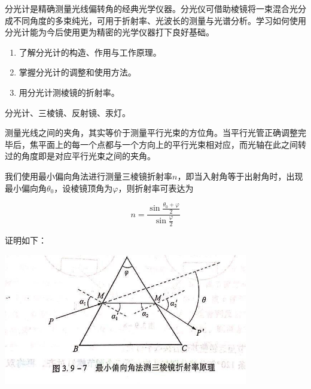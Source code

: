 \documentclass[UTF-8, a4paper, 12pt]{ctexart}
\begin{document}
    \begin{center}

    \end{center}
    \songti
    分光计是精确测量光线偏转角的经典光学仪器。分光仪可借助棱镜将一束混合光分成不同角度的多束纯光，可用于折射率、光波长的测量与光谱分析。学习如何使用分光计能为今后使用更为精密的光学仪器打下良好基础。

    \textbf{ }

    \songti

    \begin{enumerate}[（1）]
        \item 了解分光计的构造、作用与工作原理。
        \item 掌握分光计的调整和使用方法。
        \item 用分光计测棱镜的折射率。
    \end{enumerate}

    \textbf{ }

    \songti

    分光计、三棱镜、反射镜、汞灯。

    \textbf{ }

    \songti

    测量光线之间的夹角，其实等价于测量平行光束的方位角。当平行光管正确调整完毕后，焦平面上的每一个点都与一个方向上的平行光束相对应，而光轴在此之间转过的角度即是对应平行光束之间的夹角。

    我们使用最小偏向角法进行测量三棱镜折射率$n$，即当入射角等于出射角时，出现最小偏向角$\theta_0$，设棱镜顶角为$\varphi$，则折射率可表达为
    
    $$n = \frac{\sin \frac{\theta_0 + \varphi}{2}}{\sin \frac \varphi 2}$$

    证明如下：

    \begin{center}
        \includegraphics[width=0.80\textwidth]{proof_3.9.jpg}
    \end{center}
\end{document}
